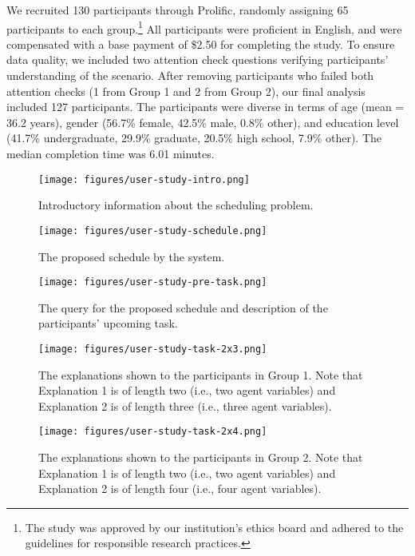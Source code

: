 \documentclass[twoside,11pt]{article}
\begin{document}
 We recruited 130 participants through Prolific, randomly assigning 65 participants to each group.\footnote{The study was approved by our institution’s ethics board and adhered to the guidelines for responsible research practices.} All participants were proficient in English, and were compensated with a base payment of \$2.50 for completing the study. To ensure data quality, we included two attention check questions verifying participants' understanding of the scenario. After removing participants who failed both attention checks (1 from Group 1 and 2 from Group 2), our final analysis included 127 participants. The participants were diverse in terms of age (mean = 36.2 years), gender (56.7\% female, 42.5\% male, 0.8\% other), and education level (41.7\% undergraduate, 29.9\% graduate, 20.5\% high school, 7.9\% other). The median completion time was 6.01 minutes.




\begin{figure}
    \centering
    \texttt{[image: figures/user-study-intro.png]}
    \caption{Introductory information about the scheduling problem.}
    \label{intro}
\end{figure}


\begin{figure}
    \centering
    \texttt{[image: figures/user-study-schedule.png]}
    \caption{The proposed schedule by the system.}
    \label{schedule}
\end{figure}


\begin{figure}
    \centering
    \texttt{[image: figures/user-study-pre-task.png]}
    \caption{The query for the proposed schedule and description of the participants' upcoming task.}
    \label{query}
\end{figure}


\begin{figure}
    \centering
    \texttt{[image: figures/user-study-task-2x3.png]}
    \caption{The explanations shown to the participants in Group 1. Note that Explanation 1 is of length two (i.e., two agent variables) and Explanation 2 is of length three (i.e., three agent variables).}
    \label{2x3}
\end{figure}


\begin{figure}
    \centering
    \texttt{[image: figures/user-study-task-2x4.png]}
    \caption{The explanations shown to the participants in Group 2. Note that Explanation 1 is of length two (i.e., two agent variables) and Explanation 2 is of length four (i.e., four agent variables).}
    \label{2x4}
\end{figure}
\end{document}
